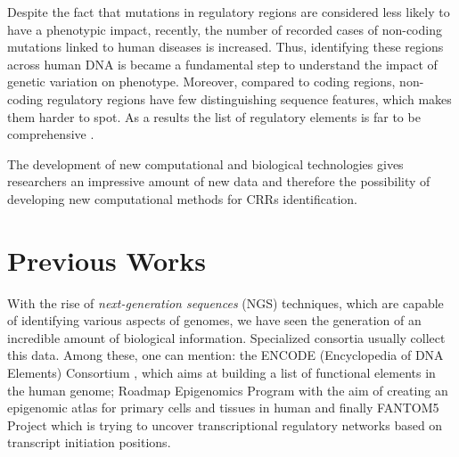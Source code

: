 Despite the fact that mutations in regulatory regions are considered less likely to have a phenotypic impact, recently, the number of recorded cases of non-coding mutations linked to human diseases is increased.
Thus, identifying these regions across
human DNA is became a fundamental step to understand the impact of
genetic variation on phenotype. 
Moreover, compared to coding regions, non-coding regulatory regions have few distinguishing sequence features, which makes them harder to spot. As a results the list of regulatory elements is far to be comprehensive \cite{NarlikarRegulaotryelements}. 

The development of new computational and
biological technologies gives researchers an impressive amount of new data and therefore the possibility of developing new computational methods
for CRRs identification.



\section{Previous Works}
With the rise of \emph{next-generation sequences} (NGS) techniques, which are
capable of identifying various aspects of genomes, we have seen the generation of an incredible amount of biological information. Specialized consortia usually collect this data. Among these, one can mention: the ENCODE
(Encyclopedia of DNA Elements) Consortium \cite{ENCODE_data}, which aims at building a list of functional elements in the human genome; Roadmap Epigenomics Program \cite{ROADMAP} with the aim of creating an epigenomic atlas for primary cells and tissues in human and finally FANTOM5 Project \cite{FANTOM_data} which is trying to uncover transcriptional regulatory networks based on transcript initiation positions.

